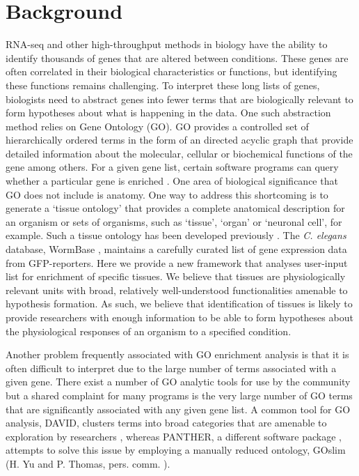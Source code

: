 \documentclass[linenumbers, doublespacing]{bmcart}
\begin{document}
\section*{Background}
	RNA-seq and other high-throughput methods in biology have the ability to identify thousands of genes that are altered between conditions. These genes are often correlated in their biological characteristics or functions, but identifying these functions remains challenging. To interpret these long lists of genes, biologists need to abstract genes into fewer terms that are biologically relevant to form hypotheses about what is happening in the data. One such abstraction method relies on Gene Ontology (GO). GO provides a controlled set of hierarchically ordered terms in the form of an directed acyclic graph  \cite{TheGeneOntologyConsortium2000, Ontology2009, TheGeneOntologyConsortium2015} that provide detailed information about the molecular, cellular or biochemical functions of the gene among others. For a given gene list, certain software programs can query whether a particular gene is enriched  \cite{Mi2009, McLean2010, Huang2009}. One area of biological significance that GO does not include is anatomy. One way to address this shortcoming is to generate a `tissue ontology' that provides a complete anatomical description for an organism or sets of organisms, such as `tissue', `organ' or `neuronal cell', for example. Such a tissue ontology has been developed previously \cite{Lee2003}.  The  \emph{C. elegans} database, WormBase \cite{Harris2014}, maintains a carefully curated list of gene expression data from GFP-reporters. 
	Here we provide a new framework that analyses user-input list for enrichment of specific tissues. We believe that tissues are physiologically relevant units with broad, relatively well-understood functionalities amenable to hypothesis formation. As such, we believe that identification of tissues is likely to provide researchers with enough information to be able to form hypotheses about the physiological responses of an organism to a specified condition. 
	
	Another problem frequently associated with GO enrichment analysis is that it is often difficult to interpret due to the large number of terms associated with a given gene. There exist a number of GO analytic tools for use by the community but a shared complaint for many programs is the very large number of GO terms that are significantly associated with any given gene list.  A common tool for GO analysis, DAVID, clusters terms into broad categories that are amenable to exploration by researchers  \cite{Huang2007}, whereas PANTHER, a different software package  \cite{Mi2009, Mi2013}, attempts to solve this issue by employing a manually reduced ontology, GOslim (H. Yu and P. Thomas, pers. comm. ).
	
\end{document}
